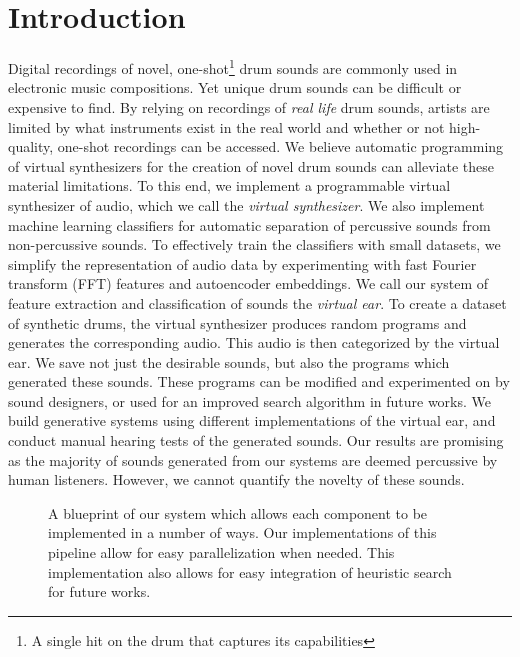 \documentclass[runningheads,a4paper]{llncs}
\begin{document}
\section{Introduction} 
Digital recordings of novel, one-shot\footnote{A single hit on the drum that captures its capabilities} drum sounds are commonly used in  electronic music compositions. Yet unique drum sounds can be difficult or expensive to find. By relying on recordings of \textit{real life} drum sounds, artists are limited by what instruments exist in the real world and whether or not high-quality, one-shot recordings can be accessed. We believe automatic programming of virtual synthesizers for the creation of novel drum sounds can alleviate these material limitations. To this end, we implement a programmable virtual synthesizer of audio, which we call the \emph{virtual synthesizer}. We also implement machine learning classifiers for automatic separation of percussive sounds from non-percussive sounds. To effectively train the classifiers with small datasets, we simplify the representation of audio data by experimenting with fast Fourier transform (FFT) features and autoencoder embeddings. We call our system of feature extraction and classification of sounds the \emph{virtual ear}. To create a dataset of synthetic drums, the virtual synthesizer produces random programs and generates the corresponding audio. This audio is then categorized by the virtual ear. We save not just the desirable sounds, but also the programs which generated these sounds. These programs can be modified and experimented on by sound designers, or used for an improved search algorithm in future works. We build generative systems using different implementations of the virtual ear, and conduct manual hearing tests of the generated sounds. Our results are promising as the majority of sounds generated from our systems are deemed percussive by human listeners. However, we cannot quantify the novelty of these sounds. 

 \begin{figure}[tbp]
    \begin{center}
    \end{center}
    \caption{A blueprint of our system which allows each component to be implemented in a number of ways. Our implementations of this pipeline allow for easy parallelization when needed. This implementation also allows for easy integration of heuristic search for future works. 
    }
\label{fig:pipeline_outline}
\end{figure}
\end{document}
